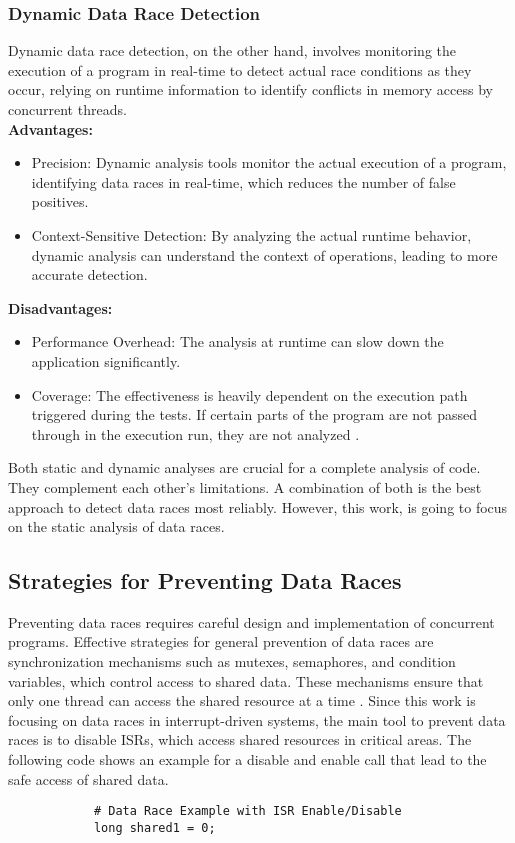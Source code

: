 \documentclass[
fancyheadings, %
%
%
]{stsreprt}
\begin{document}
{		\subsubsection{Dynamic Data Race Detection}
		Dynamic data race detection, on the other hand, involves monitoring the execution of a program in real-time to detect actual race conditions as they occur, relying on runtime information to identify conflicts in memory access by concurrent threads. \\
		\textbf{Advantages:}
		\begin{itemize}
			\item Precision: Dynamic analysis tools monitor the actual execution of a program, identifying data races in real-time, which reduces the number of false positives.
			\item Context-Sensitive Detection: By analyzing the actual runtime behavior, dynamic analysis can understand the context of operations, leading to more accurate detection.
		\end{itemize}
		\textbf{Disadvantages:}
		\begin{itemize}
			\item Performance Overhead: The analysis at runtime can slow down the application significantly.
			\item Coverage: The effectiveness is heavily dependent on the execution path triggered during the tests. If certain parts of the program are not passed through in the execution run, they are not analyzed \cite{flanagan2009}.
		\end{itemize}
		
		Both static and dynamic analyses are crucial for a complete analysis of code. They complement each other's limitations. A combination of both is the best approach to detect data races most reliably. However, this work, is going to focus on the static analysis of data races.
		
		\subsection{Strategies for Preventing Data Races}
		
		Preventing data races requires careful design and implementation of concurrent programs. Effective strategies for general prevention of data races are synchronization mechanisms such as mutexes, semaphores, and condition variables, which control access to shared data. These mechanisms ensure that only one thread can access the shared resource at a time \cite{herlihy2008}. Since this work is focusing on data races in interrupt-driven systems, the main tool to prevent data races is to disable \acp{ISR}, which access shared resources in critical areas.
		\newpage
		The following code shows an example for a disable and enable call that lead to the safe access of shared data.
		\begin{lstlisting}
			# Data Race Example with ISR Enable/Disable
			long shared1 = 0;
			

\end{lstlisting}}
\end{document}
